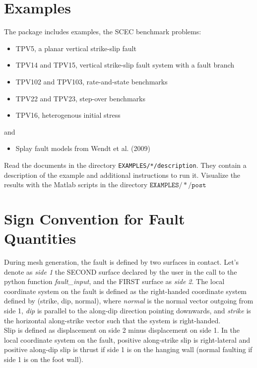 \section{Examples}

The package includes examples, the SCEC benchmark problems:
\begin{itemize}
\item TPV5, a planar vertical strike-slip fault
\item TPV14 and TPV15, vertical strike-slip fault system with a fault branch
\item TPV102 and TPV103, rate-and-state benchmarks
\item TPV22 and TPV23, step-over benchmarks
\item TPV16, heterogenous initial stress
\end{itemize}
and
\begin{itemize}
\item Splay fault models from Wendt et al. (2009)\\

\end{itemize}
Read the documents in the directory \texttt{EXAMPLES/*/description}.
They contain a description of the example and additional instructions
to run it. Visualize the results with the Matlab scripts in the directory
$\mathtt{EXAMPLES/*/post}$


\section{Sign Convention for Fault Quantities}\label{sec:Sign-Convention-for}

During mesh generation, the fault is defined by two surfaces in contact.
Let's denote as \textquotedbl{}\emph{side 1}\textquotedbl{} the SECOND
surface declared by the user in the call to the python function \textquotedbl{}\emph{fault\_input}\textquotedbl{},
and the FIRST surface as \textquotedbl{}\emph{side 2}\textquotedbl{}.
The local coordinate system on the fault is defined as the right-handed
coordinate system defined by (strike, dip, normal), where \textquotedbl{}\emph{normal}\textquotedbl{}
is the normal vector outgoing from side 1, \textquotedbl{}\emph{dip}\textquotedbl{}
is parallel to the along-dip direction pointing downwards, and \textquotedbl{}\emph{strike}\textquotedbl{}
is the horizontal along-strike vector such that the system is right-handed.\\


Slip is defined as displacement on side 2 minus displacement on side
1. In the local coordinate system on the fault, positive along-strike
slip is right-lateral and positive along-dip slip is thrust if side
1 is on the hanging wall (normal faulting if side 1 is on the foot
wall).\\



